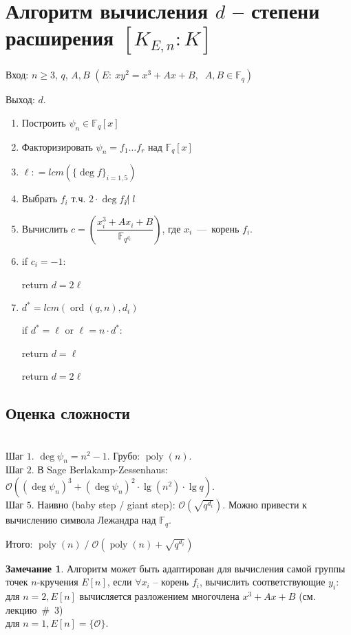 \documentclass[12pt]{article}
\newcommand{\F}{{{\mathbb F}}}
\newcommand{\bigO}{\mathcal{O}}
\theoremstyle{definition}
\theoremstyle{definition}
\theoremstyle{definition}
\newtheorem{remark}[theorem]{Замечание}
\begin{document}
\section*{Алгоритм вычисления $d$ -- степени расширения $[{K_{E,n}}:K]$}

Вход: $n \geqslant 3$, $q$, $A, B$ $( E:\:x{y^2} = {x^3} + Ax + B,\;\;A,B \in \F_q )$

Выход: $d$. 

\begin{enumerate}
	\item Построить ${\psi _n} \in {\F_q}[x]$
	
	\item Факторизировать ${\psi _n} = {f_1} \ldots {f_r}$ над ${\F_q}[x]$
	
	\item $\ell: = lcm( {{{\{ {\deg f}\}}_{i = 1,5}}} )$
	
	\item Выбрать ${f_i}$ т.ч. $2 \cdot \deg {f_i} \not | \; l$
	
	\item Вычислить $c = (\dfrac{x_i^3 + A{x_i} + B}{\F_{q^{d_i}}})$, где $x_i$~---~корень $f_i$.
	
	\item if $c_i = - 1$:
	
	\quad return $d = 2\ell$
	
	\item ${d^*} = lcm( {\operatorname{ord} ( {q,n}),{d_i}})$
	
	if ${d^*} = \ell$ or $\ell = n \cdot {d^*}$:
	
	\quad return $d = \ell$
	
	return $d = 2\ell$ 
\end{enumerate}

\subsection*{Оценка сложности} \\
Шаг $1$. $\deg \psi_n = n^2 - 1$. Грубо: $\operatorname{poly}(n)$.\\
Шаг $2$. В Sage Berlakamp-Zessenhaus: $\bigO( (\deg \psi_n)^3 + (\deg \psi_n)^2 \cdot \operatorname{lg}(n^2) \cdot \operatorname{lg}q  )$.\\
Шаг $5$. Наивно (baby step / giant step): $\bigO(\sqrt{q^{d_i}})$. Можно привести к вычислению символа Лежандра над $\F_q$.

Итого: $\operatorname{poly}(n) \;/\; \bigO(\operatorname{poly}(n) + \sqrt{q^{d_i}})$

\begin{remark}
	Алгоритм может быть адаптирован для вычисления самой группы точек $n$-кручения $E[ n]$, если $\forall {x_i}$ -- корень ${f_i}$, вычислить соответствующие ${y_i}$:\\
	для $n = 2, E[n]$ вычисляется разложением многочлена ${x^3} + Ax + B$ (см. лекцию~\#~3) \\
	для $n = 1, E[n] = \{ \bigO \}$. 
\end{remark}
\end{document}
